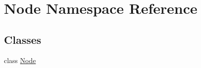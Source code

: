\hypertarget{namespace_node}{}\section{Node Namespace Reference}
\label{namespace_node}
\subsection*{Classes}
\begin{DoxyCompactItemize}
\item 
class \hyperlink{class_node_1_1_node}{Node}
\end{DoxyCompactItemize}
